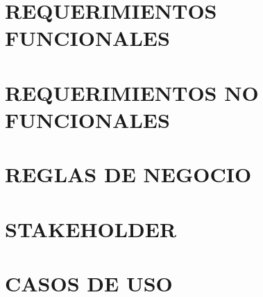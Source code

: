 \section{REQUERIMIENTOS FUNCIONALES}
	
\section{REQUERIMIENTOS NO FUNCIONALES}
	
\section{REGLAS DE NEGOCIO}
	
\section{STAKEHOLDER}
	
\section{CASOS DE USO}
	